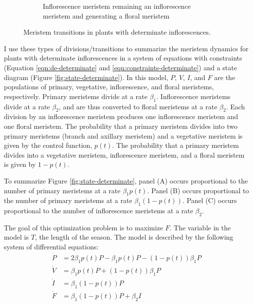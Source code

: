 \documentclass[12pt, oneside,titlepage]{article}   	%
\begin{document}
\begin{figure}[hbt!]
\begin{subfigure}{.25\textwidth}
    \caption{Inflorescence meristem remaining an inflorescence meristem and generating a floral meristem}
  \end{subfigure}
        \caption{Meristem transitions in plants with determinate inflorescences.}
\end{figure}

I use these types of divisions/transitions to summarize the meristem dynamics for plants with determinate inflorescences in a system of equations with constraints (Equation \ref{eqn:de-determinate} and \ref{eqn:constraints-determinate}) and a state diagram (Figure \ref{fig:state-determinate}). In this model, $P$, $V$, $I$, and $F$ are the populations of primary, vegetative, inflorescence, and floral meristems, respectively. Primary meristems divide at a rate $\beta_1$. Inflorescence meristems divide at a rate $\beta_2$, and are thus converted to floral meristems at a rate $\beta_2$. Each division by an inflorescence meristem produces one inflorescence meristem and one floral meristem. The probability that a primary meristem divides into two primary meristems (branch and axillary meristem) and a vegetative meristem is given by the control function, $p(t)$. The probability that a primary meristem divides into a vegetative meristem, inflorescence meristem, and a floral meristem is given by $1-p(t)$. 

To summarize Figure \ref{fig:state-determinate}, panel (A) occurs proportional to the number of primary meristems at a rate $\beta_1 p(t)$. Panel (B) occurs proportional to the number of primary meristems at a rate $\beta_1 (1-p(t))$. Panel (C) occurs proportional to the number of inflorescence meristems at a rate $\beta_2$.

The goal of this optimization problem is to maximize $F$. The variable in the model is $T$, the length of the season. The model is described by the following system of differential equations:
%
\begin{align}
\dot{P} & = 2 \beta_1 p(t) P - \beta_1 p(t) P - ( 1-p(t) ) \beta_1 P \nonumber \\
\dot{V} & = \beta_1 p(t) P + ( 1-p(t) ) \beta_1 P \nonumber \\
\dot{I} & = \beta_1 ( 1-p(t) ) P \nonumber \\ %
\dot{F} & = \beta_1 ( 1-p(t) ) P + \beta_2 I
\label{eqn:de-determinate}
\end{align}
\end{document}
